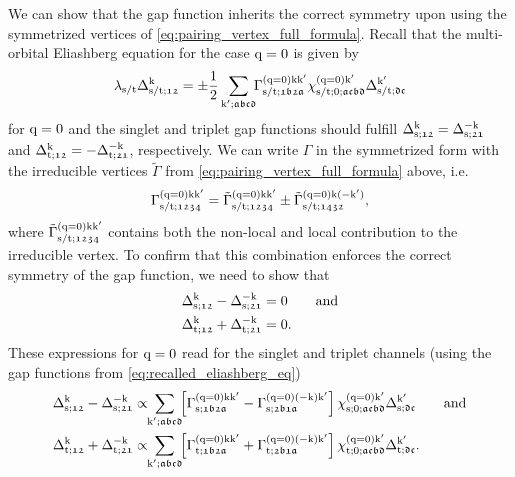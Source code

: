 \documentclass[../../main.tex]{subfiles}
\begin{document}
We can show that the gap function inherits the correct symmetry upon using the symmetrized vertices of \eqref{eq:pairing_vertex_full_formula}. Recall that the multi-orbital Eliashberg equation for the case $\text{q}=0$ is given by
\begin{align}\label{eq:recalled_eliashberg_eq}
	\lambda_{\text{s}/\text{t}}\Delta_{\text{s}/\text{t};\mathfrak{12}}^{\text{k}}=\pm\frac{1}{2}\sum_{\text{k}';\mathfrak{abcd}}\!\!\Gamma^{(\text{q}=0)\text{k}\text{k}'}_{\text{s}/\text{t};\mathfrak{1b2a}}\chi^{(\text{q}=0)\text{k}'}_{\text{s}/\text{t};0;\mathfrak{acbd}}\Delta_{\text{s}/\text{t};\mathfrak{dc}}^{\text{k}'}
\end{align}
for $\text{q}=0$ and the singlet and triplet gap functions should fulfill $\Delta_{\text{s};\mathfrak{12}}^{\text{k}}=\Delta_{\text{s};\mathfrak{21}}^{-\text{k}}$ and $\Delta_{\text{t};\mathfrak{12}}^{\text{k}}=-\Delta_{\text{t};\mathfrak{21}}^{-\text{k}}$, respectively. We can write $\Gamma$ in the symmetrized form with the irreducible vertices $\tilde{\Gamma}$ from \eqref{eq:pairing_vertex_full_formula} above, i.e.\
\begin{align}\label{eq:symmetrization_pairing_vertex}
	\Gamma^{(\text{q}=0)\text{k}\text{k}'}_{\text{s}/\text{t};\mathfrak{1234}} = \tilde{\Gamma}^{(\text{q}=0)\text{k}\text{k}'}_{\text{s}/\text{t};\mathfrak{1234}}\pm \tilde{\Gamma}^{(\text{q}=0)\text{k}(-\text{k}')}_{\text{s}/\text{t};\mathfrak{1432}},
\end{align}
where $\tilde{\Gamma}^{(\text{q}=0)\text{k}\text{k}'}_{\text{s}/\text{t};\mathfrak{1234}}$ contains both the non-local and local contribution to the irreducible vertex. To confirm that this combination enforces the correct symmetry of the gap function, we need to show that
\begin{subequations}
\begin{align}
	\Delta_{\text{s};\mathfrak{12}}^{\text{k}}-\Delta_{\text{s};\mathfrak{21}}^{-\text{k}}&=0\qquad\text{and}\\
	\Delta_{\text{t};\mathfrak{12}}^{\text{k}}+\Delta_{\text{t};\mathfrak{21}}^{-\text{k}}&=0.
\end{align}
\end{subequations}
These expressions for $\text{q}=0$ read for the singlet and triplet channels (using the gap functions from \eqref{eq:recalled_eliashberg_eq})
\begin{subequations}
\begin{align}
	\Delta_{\sing;\mathfrak{12}}^{\k}-\Delta_{\sing;\mathfrak{21}}^{-\k}&\propto\!\!\sum_{\kp;\mathfrak{abcd}}\!\! \left [\Gamma^{(\q=0)\k\kp}_{\sing;\mathfrak{1b2a}}-\Gamma^{(\q=0)(-\k)\kp}_{\sing;\mathfrak{2b1a}}\right ]\chi^{(\q=0)\kp}_{\sing;0;\mathfrak{acbd}}\Delta_{\sing;\mathfrak{dc}}^{\kp}\label{eq:symmetrization_delta_first_formula_singlet}\qqand\\
	\Delta_{\trip;\mathfrak{12}}^{\k}+\Delta_{\trip;\mathfrak{21}}^{-\k}&\propto\!\!\sum_{\kp;\mathfrak{abcd}}\!\! \left [\Gamma^{(\q=0)\k\kp}_{\trip;\mathfrak{1b2a}}+\Gamma^{(\q=0)(-\k)\kp}_{\trip;\mathfrak{2b1a}}\right ]\chi^{(\q=0)\kp}_{\trip;0;\mathfrak{acbd}}\Delta_{\trip;\mathfrak{dc}}^{\kp}\label{eq:symmetrization_delta_first_formula_triplet}.
\end{align}
\end{subequations}
\end{document}
